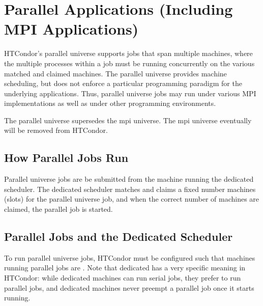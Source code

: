 \section{\label{sec:Parallel}Parallel Applications (Including MPI Applications)}

HTCondor's parallel universe supports jobs that span multiple machines,
where the multiple processes within a job must be running concurrently
on the various matched and claimed machines.
The parallel universe provides machine scheduling,
but does not enforce a particular programming paradigm for the
underlying applications.
Thus, parallel universe jobs may run under various MPI implementations
as well as under other programming environments. 

The parallel universe supersedes the mpi universe.
The mpi universe eventually will be removed from HTCondor.

\subsection{\label{sec:parallel-model}How Parallel Jobs Run}

Parallel universe jobs are be submitted from the machine running 
the dedicated scheduler.
The dedicated scheduler matches and claims a fixed number machines (slots)
for the parallel universe job,
and when the correct number of machines are claimed,
the parallel job is started.

\subsection{\label{sec:parallel-setup}Parallel Jobs and the Dedicated Scheduler}

To run parallel universe jobs, HTCondor must be configured such that 
machines running parallel jobs are .  
Note that dedicated has a very specific meaning in HTCondor:
while dedicated machines can run serial jobs, they prefer to run
parallel jobs, and dedicated machines never preempt a parallel job 
once it starts running.

